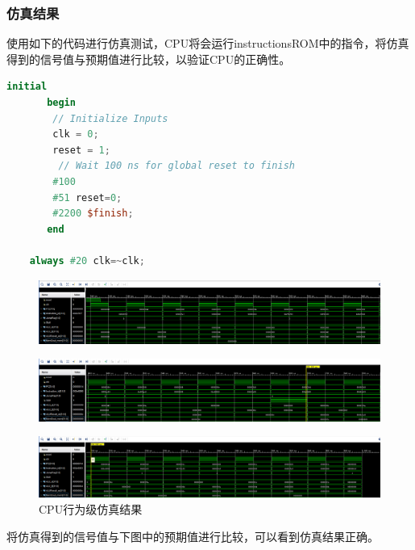 \documentclass[12pt,hyperref,a4paper,UTF8]{ctexart}
\begin{document}
\newpage


\subsubsection*{\Large 仿真结果}
\normalsize
使用如下的代码进行仿真测试，CPU将会运行instructionsROM中的指令，将仿真得到的信号值与预期值进行比较，以验证CPU的正确性。
\begin{lstlisting}[language=Verilog,caption=CPU 仿真文件]
	initial 
	   begin
		// Initialize Inputs
		clk = 0;
		reset = 1;
         // Wait 100 ns for global reset to finish
        #100
	    #51 reset=0;
     	#2200 $finish;
	   end
	
	always #20 clk=~clk;
\end{lstlisting}


    \begin{figure}[H]
        \centering
        \includegraphics[width=1\textwidth]{figures/fig/sim7.png}
    \end{figure}
        \begin{figure}[H]
        \centering
        \includegraphics[width=1\textwidth]{figures/fig/sim8.png}
    \end{figure}
    \begin{figure}[H]
        \centering
        \includegraphics[width=1\textwidth]{figures/fig/sim9.png}
        \caption{CPU行为级仿真结果}
    \end{figure}

    将仿真得到的信号值与下图中的预期值进行比较，可以看到仿真结果正确。
\end{document}
